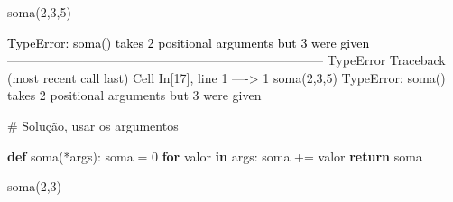 \documentclass[
  letterpaper,
  DIV=11,
  numbers=noendperiod]{scrreprt}
\newenvironment{Shaded}{\begin{snugshade}}{\end{snugshade}}
\newcommand{\CommentTok}[1]{\textcolor[rgb]{0.37,0.37,0.37}{#1}}
\newcommand{\ControlFlowTok}[1]{\textcolor[rgb]{0.00,0.23,0.31}{\textbf{#1}}}
\newcommand{\DecValTok}[1]{\textcolor[rgb]{0.68,0.00,0.00}{#1}}
\newcommand{\KeywordTok}[1]{\textcolor[rgb]{0.00,0.23,0.31}{\textbf{#1}}}
\newcommand{\NormalTok}[1]{\textcolor[rgb]{0.00,0.23,0.31}{#1}}
\newcommand{\OperatorTok}[1]{\textcolor[rgb]{0.37,0.37,0.37}{#1}}
\begin{document}
\begin{Shaded}
\begin{Highlighting}[]
\NormalTok{soma(}\DecValTok{2}\NormalTok{,}\DecValTok{3}\NormalTok{,}\DecValTok{5}\NormalTok{)}
\end{Highlighting}
\end{Shaded}

\begin{Highlighting}
\textcolor{black}{TypeError: soma() takes 2 positional arguments but 3 were given}
\textcolor{black}{}\textcolor{QuartoInternalColor1}{---------------------------------------------------------------------------}\textcolor{QuartoInternalColor2}{}
\textcolor{QuartoInternalColor2}{}\textcolor{QuartoInternalColor1}{TypeError}\textcolor{QuartoInternalColor2}{                                 Traceback (most recent call last)}
\textcolor{QuartoInternalColor2}{Cell }\textcolor{QuartoInternalColor3}{In[17], line 1}\textcolor{QuartoInternalColor2}{}
\textcolor{QuartoInternalColor2}{}\textcolor{QuartoInternalColor3}{----> 1}\textcolor{QuartoInternalColor2}{ }\textcolor{QuartoInternalColor2}{soma}\textcolor{QuartoInternalColor2}{}\textcolor{QuartoInternalColor2}{(}\textcolor{QuartoInternalColor2}{}\textcolor{QuartoInternalColor5}{2}\textcolor{QuartoInternalColor2}{}\textcolor{QuartoInternalColor2}{,}\textcolor{QuartoInternalColor2}{}\textcolor{QuartoInternalColor5}{3}\textcolor{QuartoInternalColor2}{}\textcolor{QuartoInternalColor2}{,}\textcolor{QuartoInternalColor2}{}\textcolor{QuartoInternalColor5}{5}\textcolor{QuartoInternalColor2}{}\textcolor{QuartoInternalColor2}{)}\textcolor{QuartoInternalColor2}{}
\textcolor{QuartoInternalColor2}{}\textcolor{QuartoInternalColor1}{TypeError}\textcolor{QuartoInternalColor2}{: soma() takes 2 positional arguments but 3 were given}
\end{Highlighting}

\begin{Shaded}
\begin{Highlighting}[]
\CommentTok{\# Solução, usar os argumentos}

\KeywordTok{def}\NormalTok{ soma(}\OperatorTok{*}\NormalTok{args):}
\NormalTok{    soma }\OperatorTok{=} \DecValTok{0}
    \ControlFlowTok{for}\NormalTok{ valor }\KeywordTok{in}\NormalTok{ args:}
\NormalTok{        soma }\OperatorTok{+=}\NormalTok{ valor}
    \ControlFlowTok{return}\NormalTok{ soma}
\end{Highlighting}
\end{Shaded}

\begin{Shaded}
\begin{Highlighting}[]
\NormalTok{soma(}\DecValTok{2}\NormalTok{,}\DecValTok{3}\NormalTok{)}
\end{Highlighting}
\end{Shaded}
\end{document}

